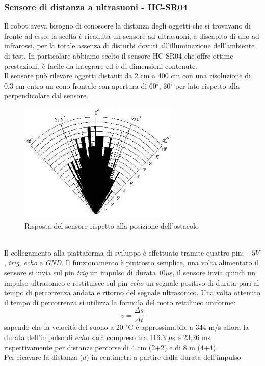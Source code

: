 \subsubsection{Sensore di distanza a ultrasuoni - HC-SR04}
Il robot aveva bisogno di conoscere la distanza degli oggetti che si trovavano 
di fronte ad esso, la scelta è ricaduta un sensore ad ultrasuoni, a discapito di
 uno ad infrarossi, per la totale assenza di disturbi dovuti all'illuminazione 
 dell'ambiente di test. In particolare abbiamo scelto il sensore HC-SR04 che 
 offre ottime prestazioni, è facile da integrare ed è di dimensioni contenute.\\
Il sensore può rilevare oggetti distanti da 2 cm a 400 cm con una risoluzione 
di 0,3 cm entro un cono frontale con apertura di 60$^\circ$, 30$^\circ$ per lato 
rispetto alla perpendicolare dal sensore.
\begin{figure}[!htb] \center
\includegraphics[scale=0.6]{immagini/HC-SR04_Angle.png}
\caption{Risposta del sensore rispetto alla posizione dell'ostacolo} 
\end{figure}
\\Il collegamento alla piattaforma di sviluppo è effettuato tramite quattro pin: 
\textit{$+5V$}, \textit{trig}, \textit{echo} e \textit{GND}.
Il funzionamento è piuttosto semplice, una volta alimentato il sensore si invia 
sul pin \textit{trig} un impulso di durata $10 \mu$s, il sensore invia 
quindi un impulso ultrasonico e restituisce sul pin \textit{echo} un segnale 
positivo di durata pari al tempo di percorrenza andata e ritorno del segnale 
ultrasonico. Una volta ottenuto il tempo di percorrenza si utilizza la formula 
del moto rettilineo uniforme:
$$v = \frac{\Delta s}{\Delta t}$$
sapendo che la velocità del suono a 20 $^\circ$C è approssimabile a 344 m/s allora 
la durata dell'impulso di $echo$ sarà compreso tra 116.3 $\mu$s e 23,26 ms 
rispettivamente per distanze percorse di 4 cm (2+2) e di 8 m (4+4).
\\Per ricavare la distanza ($d$) in centimetri a partire dalla durata dell'impulso 
